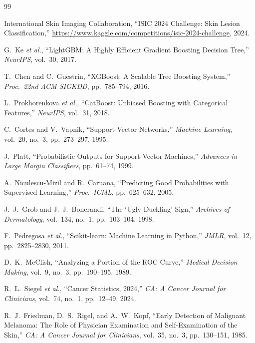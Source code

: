 \documentclass[conference]{IEEEtran}
\begin{document}

\begin{thebibliography}{99}

International Skin Imaging Collaboration,
``ISIC 2024 Challenge: Skin Lesion Classification,''
\url{https://www.kaggle.com/competitions/isic-2024-challenge}, 2024.

G.~Ke \emph{et al.},
``LightGBM: A Highly Efficient Gradient Boosting Decision Tree,''
\emph{NeurIPS}, vol.~30, 2017.

T.~Chen and C.~Guestrin,
``XGBoost: A Scalable Tree Boosting System,''
\emph{Proc.\ 22nd ACM SIGKDD}, pp.~785--794, 2016.

L.~Prokhorenkova \emph{et al.},
``CatBoost: Unbiased Boosting with Categorical Features,''
\emph{NeurIPS}, vol.~31, 2018.

C.~Cortes and V.~Vapnik,
``Support-Vector Networks,''
\emph{Machine Learning}, vol.~20, no.~3, pp.~273--297, 1995.

J.~Platt,
``Probabilistic Outputs for Support Vector Machines,''
\emph{Advances in Large Margin Classifiers}, pp.~61--74, 1999.

A.~Niculescu-Mizil and R.~Caruana,
``Predicting Good Probabilities with Supervised Learning,''
\emph{Proc.\ ICML}, pp.~625--632, 2005.

J.~J.~Grob and J.~J.~Bonerandi,
``The `Ugly Duckling' Sign,''
\emph{Archives of Dermatology}, vol.~134, no.~1, pp.~103--104, 1998.

F.~Pedregosa \emph{et al.},
``Scikit-learn: Machine Learning in Python,''
\emph{JMLR}, vol.~12, pp.~2825--2830, 2011.

D.~K.~McClish,
``Analyzing a Portion of the ROC Curve,''
\emph{Medical Decision Making}, vol.~9, no.~3, pp.~190--195, 1989.

R.~L.~Siegel \emph{et al.},
``Cancer Statistics, 2024,''
\emph{CA: A Cancer Journal for Clinicians}, vol.~74, no.~1,
pp.~12--49, 2024.

R.~J.~Friedman, D.~S.~Rigel, and A.~W.~Kopf,
``Early Detection of Malignant Melanoma: The Role of Physician
Examination and Self-Examination of the Skin,''
\emph{CA: A Cancer Journal for Clinicians}, vol.~35, no.~3,
pp.~130--151, 1985.


\end{thebibliography}
\end{document}
